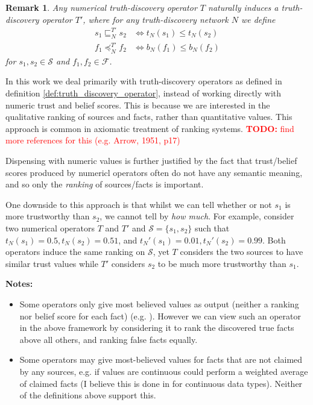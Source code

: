 \documentclass{article}
\theoremstyle{definition} \newtheorem{definition}{Definition}
\theoremstyle{definition} \newtheorem{example}{Example}
\theoremstyle{plain} \newtheorem{axiom}{Axiom}
\theoremstyle{plain} \newtheorem*{remark}{Remark}
\theoremstyle{remark} \newtheorem*{notation}{Notation}
\theoremstyle{plain} \newtheorem{lemma}{Lemma}
\theoremstyle{plain} \newtheorem{theorem}{Theorem}
\theoremstyle{plain} \newtheorem{proposition}{Proposition}
\newcommand{\todo}[1] {
    \textcolor{red}{
        \textbf{TODO:} #1
    }
}
\renewcommand{\S}{\mathcal{S}}  %
\newcommand{\F}{\mathcal{F}}
\newcommand{\sle}{\sqsubseteq}
\newcommand{\fle}{\preceq}
\begin{document}
\begin{remark}
    Any numerical truth-discovery operator $T$ naturally induces a
    truth-discovery operator $T'$, where for any truth-discovery network $N$
    we define
    \begin{align*}
    s_1 \sle_N^{T'} s_2 & \iff t_N(s_1) \le t_N(s_2) \\
    f_1 \fle_N^{T'} f_2 & \iff b_N(f_1) \le b_N(f_2)
    \end{align*}
    for $s_1, s_2 \in \S$ and $f_1, f_2 \in \F$.
\end{remark}

In this work we deal primarily with truth-discovery operators as defined in
definition \ref{def:truth_discovery_operator}, instead of working directly
with numeric trust and belief scores. This is because we are interested in the
qualitative ranking of sources and facts, rather than quantitative values. This
approach is common in axiomatic treatment of ranking
systems{\cite{altman,altman_personalised}}. \todo{find more references for this
(e.g. Arrow, 1951, p17)}

Dispensing with numeric values is further justified by the fact that
trust/belief scores produced by numericl operators often do not have any
semantic meaning\cite{pasternack}, and so only the \emph{ranking} of
sources/facts is important.

One downside to this approach is that whilst we can tell whether or not $s_1$
is more trustworthy than $s_2$, we cannot tell by \emph{how much}.  For
example, consider two numerical operators $T$ and $T'$ and $\S=\{s_1, s_2\}$
such that $t_N(s_1)=0.5, t_N(s_2)=0.51$, and $t_N'(s_1)=0.01,
t_N'(s_2)=0.99$. Both operators induce the same ranking on $\S$, yet $T$
considers the two sources to have similar trust values while $T'$ considers
$s_2$ to be much more trustworthy than $s_1$.

\textbf{Notes:}
\begin{itemize}

\item Some operators only give most believed values as output (neither a
ranking nor belief score for each fact) (e.g. \cite{li_conflicts}). However we
can view such an operator in the above framework by considering it to rank the
discovered true facts above all others, and ranking false facts equally.

\item Some operators may give most-believed values for facts that are not
claimed by any sources, e.g. if values are continuous could perform a weighted
average of claimed facts (I believe this is done in \cite{li_conflicts} for
continuous data types). Neither of the definitions above support this.

\end{itemize}
\end{document}
